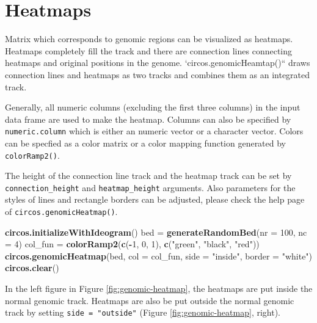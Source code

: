 \documentclass[]{book}
\newenvironment{Shaded}{\begin{snugshade}}{\end{snugshade}}
\newcommand{\KeywordTok}[1]{\textcolor[rgb]{0.13,0.29,0.53}{\textbf{#1}}}
\newcommand{\DataTypeTok}[1]{\textcolor[rgb]{0.13,0.29,0.53}{#1}}
\newcommand{\DecValTok}[1]{\textcolor[rgb]{0.00,0.00,0.81}{#1}}
\newcommand{\StringTok}[1]{\textcolor[rgb]{0.31,0.60,0.02}{#1}}
\newcommand{\OperatorTok}[1]{\textcolor[rgb]{0.81,0.36,0.00}{\textbf{#1}}}
\newcommand{\NormalTok}[1]{#1}
\theoremstyle{definition}
\theoremstyle{definition}
\theoremstyle{remark}
\begin{document}
\section{Heatmaps}\label{genomic-heatmap}

Matrix which corresponds to genomic regions can be visualized as
heatmaps. Heatmaps completely fill the track and there are connection
lines connecting heatmaps and original positions in the genome.
`circos.genomicHeamtap()`` draws connection lines and heatmaps as two
tracks and combines them as an integrated track.

Generally, all numeric columns (excluding the first three columns) in
the input data frame are used to make the heatmap. Columns can also be
specified by \texttt{numeric.column} which is either an numeric vector
or a character vector. Colors can be specfied as a color matrix or a
color mapping function generated by \texttt{colorRamp2()}.

The height of the connection line track and the heatmap track can be set
by \texttt{connection\_height} and \texttt{heatmap\_height} arguments.
Also parameters for the styles of lines and rectangle borders can be
adjusted, please check the help page of
\texttt{circos.genomicHeatmap()}.

\begin{Shaded}
\begin{Highlighting}[]
\KeywordTok{circos.initializeWithIdeogram}\NormalTok{()}
\NormalTok{bed =}\StringTok{ }\KeywordTok{generateRandomBed}\NormalTok{(}\DataTypeTok{nr =} \DecValTok{100}\NormalTok{, }\DataTypeTok{nc =} \DecValTok{4}\NormalTok{)}
\NormalTok{col_fun =}\StringTok{ }\KeywordTok{colorRamp2}\NormalTok{(}\KeywordTok{c}\NormalTok{(}\OperatorTok{-}\DecValTok{1}\NormalTok{, }\DecValTok{0}\NormalTok{, }\DecValTok{1}\NormalTok{), }\KeywordTok{c}\NormalTok{(}\StringTok{"green"}\NormalTok{, }\StringTok{"black"}\NormalTok{, }\StringTok{"red"}\NormalTok{))}
\KeywordTok{circos.genomicHeatmap}\NormalTok{(bed, }\DataTypeTok{col =}\NormalTok{ col_fun, }\DataTypeTok{side =} \StringTok{"inside"}\NormalTok{, }\DataTypeTok{border =} \StringTok{"white"}\NormalTok{)}
\KeywordTok{circos.clear}\NormalTok{()}
\end{Highlighting}
\end{Shaded}

In the left figure in Figure \ref{fig:genomic-heatmap}, the heatmaps are
put inside the normal genomic track. Heatmaps are also be put outside
the normal genomic track by setting \texttt{side\ =\ "outside"} (Figure
\ref{fig:genomic-heatmap}, right).
\end{document}
